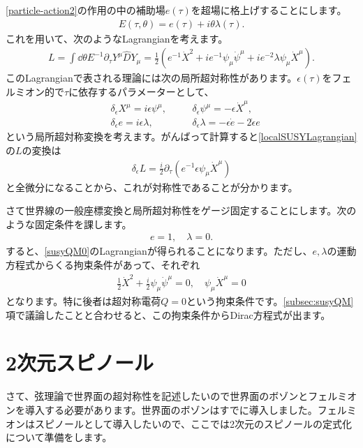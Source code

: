 \documentclass[report,paper=a4, fontsize=12pt, line_length=16cm, number_of_lines=34,dvipdfmx]{jlreq}
\numberwithin{equation}{chapter}
\numberwithin{equation}{section}
\newcommand{\del}{\partial}
\newcommand{\Dh}{\widehat{D}}
\begin{document}
\eqref{particle-action2}の作用の中の補助場$e(\tau)$を超場に格上げすることにします。
\begin{align}
  E(\tau,\theta)=e(\tau)+i\theta \lambda(\tau).
\end{align}
これを用いて、次のようなLagrangianを考えます。
\begin{align}
  L=\int \dd{\theta} E^{-1}\del_{\tau}Y^{\mu}\Dh Y_{\mu}
=\frac12(e^{-1}\dot{X}^2+ie^{-1}\psi_{\mu}\dot{\psi}^{\mu}+ie^{-2}\lambda \psi_{\mu}\dot{X}^{\mu}).\label{localSUSYLagrangian}
\end{align}
このLagrangianで表される理論には次の局所超対称性があります。$\epsilon(\tau)$をフェルミオン的で$\tau$に依存するパラメーターとして、
\begin{align}
  &\delta_{\epsilon}X^{\mu}=i\epsilon \psi^{\mu},\quad
  &&\delta_{\epsilon}\psi^{\mu}=-\epsilon \dot{X}^{\mu},\\
  &\delta_{\epsilon}e = i\epsilon \lambda,
  && \delta_{\epsilon}\lambda = -\epsilon \dot{e}-2 \dot{\epsilon} e
\end{align}
という局所超対称変換を考えます。がんばって計算すると\eqref{localSUSYLagrangian}の$L$の変換は
\begin{align}
  \delta_{\epsilon}L=\frac{i}{2}\del_{\tau}(e^{-1}\epsilon \psi_{\mu}\dot{X}^{\mu})
\end{align}
と全微分になることから、これが対称性であることが分かります。

さて世界線の一般座標変換と局所超対称性をゲージ固定することにします。次のような固定条件を課します。
\begin{align}
  e=1,\quad \lambda=0.
\end{align}
すると、\eqref{susyQM0}のLagrangianが得られることになります。ただし、$e,\lambda$の運動方程式からくる拘束条件があって、それぞれ
\begin{align}
  \frac12\dot{X}^2+\frac{i}{2} \psi_{\mu}\dot{\psi}^{\mu}=0,\quad \psi_{\mu}\dot{X}^{\mu}=0
\end{align}
となります。特に後者は超対称電荷$Q=0$という拘束条件です。\ref{subsec:susyQM}項で議論したことと合わせると、この拘束条件からDirac方程式が出ます。

\section{2次元スピノール}
さて、弦理論で世界面の超対称性を記述したいので世界面のボゾンとフェルミオンを導入する必要があります。世界面のボゾンはすでに導入しました。フェルミオンはスピノールとして導入したいので、ここでは2次元のスピノールの定式化について準備をします。
\end{document}
